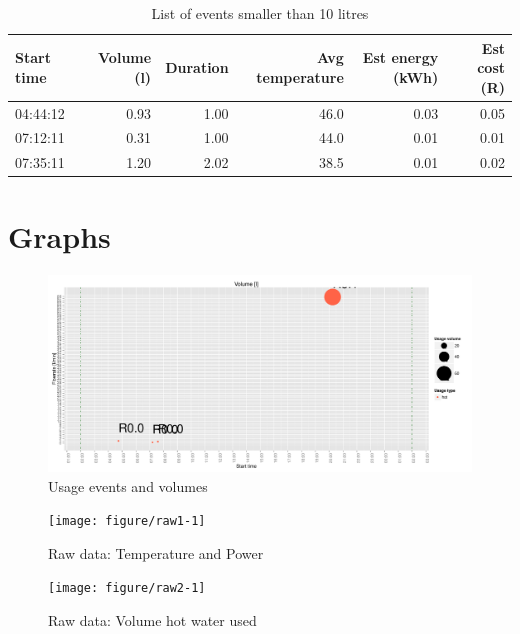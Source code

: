 \documentclass{article}\usepackage[]{graphicx}\usepackage[]{color}
\makeatletter
\def\maxwidth{ %
  \ifdim\Gin@nat@width>\linewidth
    \linewidth
  \else
    \Gin@nat@width
  \fi
}
\newenvironment{knitrout}{}{} %
\makeatother
\begin{document}
\begin{center}
\begin{table}[h!]
\begin{knitrout}
\color{fgcolor}
\begin{tabular}{l|r|r|r|r|r}
\hline
Start time & Volume (l) & Duration & Avg temperature & Est energy (kWh) & Est cost (R)\\
\hline
04:44:12 & 0.93 & 1.00 & 46.0 & 0.03 & 0.05\\
\hline
07:12:11 & 0.31 & 1.00 & 44.0 & 0.01 & 0.01\\
\hline
07:35:11 & 1.20 & 2.02 & 38.5 & 0.01 & 0.02\\
\hline
\end{tabular}


\end{knitrout}
\caption{List of events smaller than 10 litres}
\end{table}
\end{center}




\newpage

\section{Graphs}
\begin{knitrout}
\color{fgcolor}\begin{figure}[h!]

{\centering \includegraphics[width=\maxwidth]{figure/balloon-1} 

}

\caption[Usage events and volumes]{Usage events and volumes}\label{fig:balloon}
\end{figure}


\end{knitrout}

\begin{knitrout}
\color{fgcolor}\begin{figure}[h!]
\texttt{[image: figure/raw1-1]} \caption[Raw data]{Raw data: Temperature and Power}\label{fig:raw1}
\end{figure}


\end{knitrout}

\begin{knitrout}
\color{fgcolor}\begin{figure}[h!]
\texttt{[image: figure/raw2-1]} \caption[Raw data]{Raw data: Volume hot water used}\label{fig:raw2}
\end{figure}


\end{knitrout}
\end{document}
